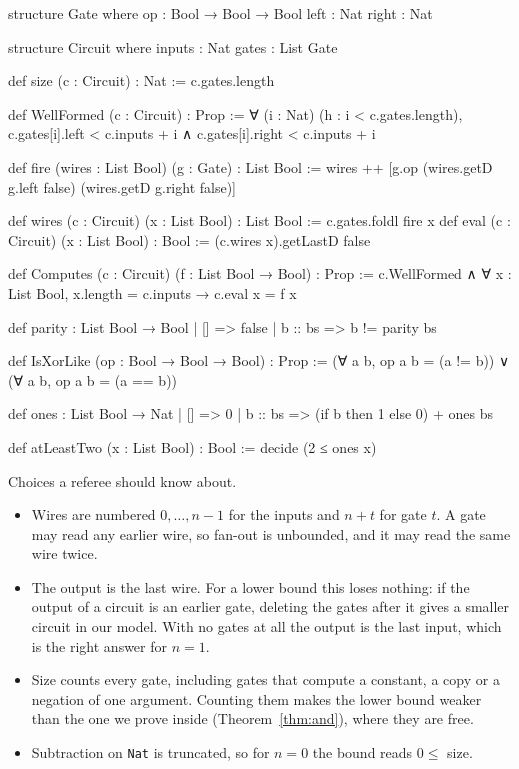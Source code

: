 \documentclass[11pt]{amsart}
\theoremstyle{definition}
\theoremstyle{remark}
\newcommand{\lean}[1]{\texttt{#1}}
\begin{document}
\begin{leancode}
structure Gate where
  op : Bool → Bool → Bool
  left : Nat
  right : Nat

structure Circuit where
  inputs : Nat
  gates : List Gate

def size (c : Circuit) : Nat := c.gates.length

def WellFormed (c : Circuit) : Prop :=
  ∀ (i : Nat) (h : i < c.gates.length),
    c.gates[i].left < c.inputs + i ∧ c.gates[i].right < c.inputs + i

def fire (wires : List Bool) (g : Gate) : List Bool :=
  wires ++ [g.op (wires.getD g.left false) (wires.getD g.right false)]

def wires (c : Circuit) (x : List Bool) : List Bool := c.gates.foldl fire x
def eval (c : Circuit) (x : List Bool) : Bool := (c.wires x).getLastD false

def Computes (c : Circuit) (f : List Bool → Bool) : Prop :=
  c.WellFormed ∧ ∀ x : List Bool, x.length = c.inputs → c.eval x = f x

def parity : List Bool → Bool
  | [] => false
  | b :: bs => b != parity bs

def IsXorLike (op : Bool → Bool → Bool) : Prop :=
  (∀ a b, op a b = (a != b)) ∨ (∀ a b, op a b = (a == b))

def ones : List Bool → Nat
  | [] => 0
  | b :: bs => (if b then 1 else 0) + ones bs

def atLeastTwo (x : List Bool) : Bool := decide (2 ≤ ones x)
\end{leancode}

Choices a referee should know about.
\begin{itemize}
\item Wires are numbered $0,\dots,n-1$ for the inputs and $n+t$ for gate $t$. A gate may read
  any earlier wire, so fan-out is unbounded, and it may read the same wire twice.
\item The output is the last wire. For a lower bound this loses nothing: if the output of a
  circuit is an earlier gate, deleting the gates after it gives a smaller circuit in our
  model. With no gates at all the output is the last input, which is the right answer for
  $n=1$.
\item Size counts every gate, including gates that compute a constant, a copy or a negation
  of one argument. Counting them makes the lower bound weaker than the one we prove inside
  (Theorem~\ref{thm:and}), where they are free.
\item Subtraction on \lean{Nat} is truncated, so for $n=0$ the bound reads $0\le$ size.
\end{itemize}
\end{document}
